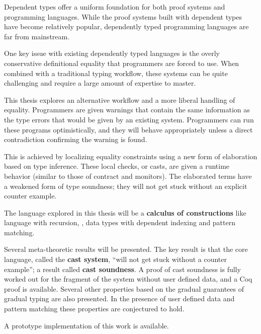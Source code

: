Dependent types offer a uniform foundation for both proof systems and programming languages.
While the proof systems built with dependent types have become relatively popular, dependently typed programming languages are far from mainstream.

One key issue with existing dependently typed languages is the overly conservative definitional equality that programmers are forced to use.
When combined with a traditional typing workflow, these systems can be quite challenging and require a large amount of expertise to master.

This thesis explores an alternative workflow and a more liberal handling of equality.
Programmers are given warnings that contain the same information as the type errors that would be given by an existing system.
Programmers can run these programs optimistically, and they will behave appropriately unless a direct contradiction confirming the warning is found.

This is achieved by localizing equality constraints using a new form of elaboration based on \bidir{} type inference.
These local checks, or casts, are given a runtime behavior (similar to those of contract and monitors).
The elaborated terms have a weakened form of type soundness; they will not get stuck without an explicit counter example.

The language explored in this thesis will be a \textbf{calculus of constructions} like language with recursion, \tit{}, data types with dependent indexing and pattern matching.

Several meta-theoretic results will be presented.
The key result is that the core language, called the \textbf{cast system}, ``will not get stuck without a counter example''; a result called \textbf{cast soundness}.
A proof of cast soundness is fully worked out for the fragment of the system without user defined data, and a Coq proof is available. Several other properties based on the gradual guarantees of gradual typing are also presented.
In the presence of user defined data and pattern matching these properties are conjectured to hold.

A prototype implementation of this work is available.

